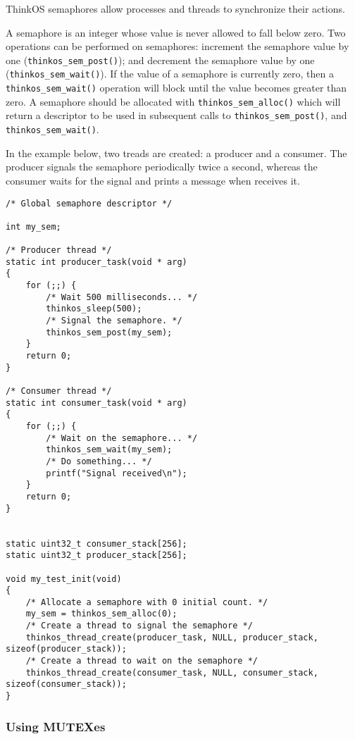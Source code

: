 ThinkOS semaphores allow processes and threads to synchronize their actions.

A semaphore is an integer whose value is never allowed to fall below zero. Two operations can be performed on semaphores: increment the semaphore value by one (\lstinline{thinkos_sem_post()}); and decrement the semaphore value by one (\lstinline{thinkos_sem_wait()}). If the value of a semaphore is currently zero, then a \lstinline{thinkos_sem_wait()} operation will block until the value becomes greater than zero. A semaphore should be allocated with \lstinline{thinkos_sem_alloc()} which will return a descriptor to be used in subsequent calls to  \lstinline{thinkos_sem_post()}, and \lstinline{thinkos_sem_wait()}.

In the example below, two treads are created: a producer and a consumer. The producer signals the semaphore periodically twice a second, whereas the consumer waits for the signal and prints a message when receives it.

\begin{lstlisting}[caption={Using semaphores example},label={lst:example2},language=C99,frame=single]
/* Global semaphore descriptor */

int my_sem;

/* Producer thread */
static int producer_task(void * arg)
{
    for (;;) {
        /* Wait 500 milliseconds... */
        thinkos_sleep(500);
        /* Signal the semaphore. */
        thinkos_sem_post(my_sem);
    }
    return 0;
}

/* Consumer thread */
static int consumer_task(void * arg)
{
    for (;;) {
        /* Wait on the semaphore... */
        thinkos_sem_wait(my_sem);
        /* Do something... */
        printf("Signal received\n");
    }
    return 0;
}


static uint32_t consumer_stack[256];
static uint32_t producer_stack[256];

void my_test_init(void)
{
    /* Allocate a semaphore with 0 initial count. */
    my_sem = thinkos_sem_alloc(0);
    /* Create a thread to signal the semaphore */
    thinkos_thread_create(producer_task, NULL, producer_stack, sizeof(producer_stack));
    /* Create a thread to wait on the semaphore */
    thinkos_thread_create(consumer_task, NULL, consumer_stack, sizeof(consumer_stack));
}
\end{lstlisting}

\subsubsection{Using MUTEXes}

